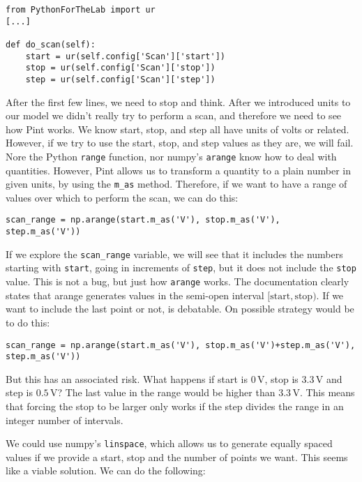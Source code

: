 \begin{verbatim}
from PythonForTheLab import ur
[...]

def do_scan(self):
    start = ur(self.config['Scan']['start'])
    stop = ur(self.config['Scan']['stop'])
    step = ur(self.config['Scan']['step'])
\end{verbatim}

After the first few lines, we need to stop and think. After we introduced units to our model we didn't really try to perform a scan, and therefore we need to see how Pint works. We know start, stop, and step all have units of volts or related. However, if we try to use the start, stop, and step values as they are, we will fail. Nore the Python \texttt{range} function, nor numpy's \texttt{arange} know how to deal with quantities. However, Pint allows us to transform a quantity to a plain number in given units, by using the \texttt{m\_as} method. Therefore, if we want to have a range of values over which to perform the scan, we can do this:

\begin{verbatim}
scan_range = np.arange(start.m_as('V'), stop.m_as('V'), step.m_as('V'))
\end{verbatim}

If we explore the \texttt{scan\_range} variable, we will see that it includes the numbers starting with \texttt{start}, going in increments of \texttt{step}, but it does not include the \texttt{stop} value. This is not a bug, but just how \texttt{arange} works. The documentation clearly states that arange generates values in the semi-open interval $[\textrm{start}, \textrm{stop})$. If we want to include the last point or not, is debatable. On possible strategy would be to do this:

\begin{verbatim}
scan_range = np.arange(start.m_as('V'), stop.m_as('V')+step.m_as('V'), step.m_as('V'))
\end{verbatim}

But this has an associated risk. What happens if start is $0\,\textrm{V}$, stop is $3.3\,\textrm{V}$ and step is $0.5\,\textrm{V}$? The last value in the range would be higher than $3.3\,\textrm{V}$. This means that forcing the stop to be larger only works if the step divides the range in an integer number of intervals.

We could use numpy's \texttt{linspace}, which allows us to generate equally spaced values if we provide a start, stop and the number of points we want. This seems like a viable solution. We can do the following:

